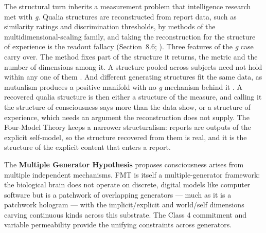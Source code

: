 \documentclass[12pt]{article}
\begin{document}
The structural turn inherits a measurement problem that intelligence research met with \emph{g}. Qualia structures are reconstructed from report data, such as similarity ratings and discrimination thresholds, by methods of the multidimensional-scaling family, and taking the reconstruction for the structure of experience is the readout fallacy (Section~8.6; \citealp[p.~45]{Gruber2015}). Three features of the \emph{g} case carry over. The method fixes part of the structure it returns, the metric and the number of dimensions among it. A structure pooled across subjects need not hold within any one of them \citep{Borsboom2003}. And different generating structures fit the same data, as mutualism produces a positive manifold with no \emph{g} mechanism behind it \citep{vanderMaas2006}. A recovered qualia structure is then either a structure of the measure, and calling it the structure of consciousness says more than the data show, or a structure of experience, which needs an argument the reconstruction does not supply. The Four-Model Theory keeps a narrower structuralism: reports are outputs of the explicit self-model, so the structure recovered from them is real, and it is the structure of the explicit content that enters a report.

The \textbf{Multiple Generator Hypothesis} \citep{KirkebyHinrup2025} proposes consciousness arises from multiple independent mechanisms. FMT is itself a multiple-generator framework: the biological brain does not operate on discrete, digital models like computer software but is a patchwork of overlapping generators --- much as it is a patchwork hologram --- with the implicit/explicit and world/self dimensions carving continuous kinds across this substrate. The Class 4 commitment and variable permeability provide the unifying constraints across generators.
\end{document}
